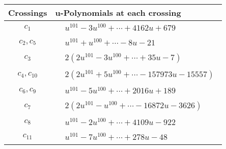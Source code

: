\documentclass[1p]{elsarticle_modified}
\theoremstyle{definition}
\begin{document}
\begin{tabular}{m{50pt}|m{274pt}}
Crossings & \hspace{64pt}u-Polynomials at each crossing \\
\hline $$\begin{aligned}c_{1}\end{aligned}$$&$\begin{aligned}
&u^{101}-3 u^{100}+\cdots+4162 u+679
\end{aligned}$\\
\hline $$\begin{aligned}c_{2},c_{5}\end{aligned}$$&$\begin{aligned}
&u^{101}+u^{100}+\cdots-8 u-21
\end{aligned}$\\
\hline $$\begin{aligned}c_{3}\end{aligned}$$&$\begin{aligned}
&2(2 u^{101}-3 u^{100}+\cdots+35 u-7)
\end{aligned}$\\
\hline $$\begin{aligned}c_{4},c_{10}\end{aligned}$$&$\begin{aligned}
&2(2 u^{101}+5 u^{100}+\cdots-157973 u-15557)
\end{aligned}$\\
\hline $$\begin{aligned}c_{6},c_{9}\end{aligned}$$&$\begin{aligned}
&u^{101}-5 u^{100}+\cdots+2016 u+189
\end{aligned}$\\
\hline $$\begin{aligned}c_{7}\end{aligned}$$&$\begin{aligned}
&2(2 u^{101}- u^{100}+\cdots-16872 u-3626)
\end{aligned}$\\
\hline $$\begin{aligned}c_{8}\end{aligned}$$&$\begin{aligned}
&u^{101}-2 u^{100}+\cdots+4109 u-922
\end{aligned}$\\
\hline $$\begin{aligned}c_{11}\end{aligned}$$&$\begin{aligned}
&u^{101}-7 u^{100}+\cdots+278 u-48
\end{aligned}$\\
\hline
\end{tabular}\\~\\
\end{document}
